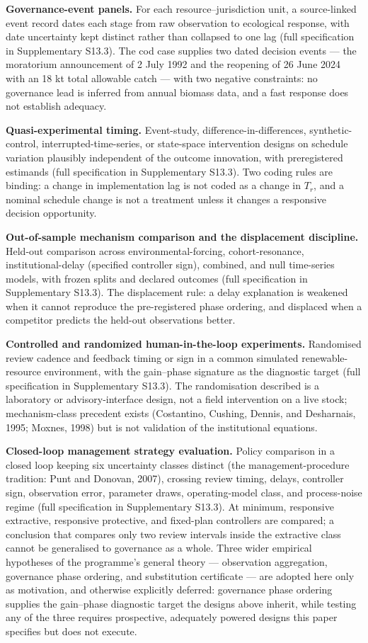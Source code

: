 \documentclass[11pt]{article}
\begin{document}
\textbf{Governance-event panels.} For each resource--jurisdiction unit, a source-linked event record dates each stage from raw observation to ecological response, with date uncertainty kept distinct rather than collapsed to one lag (full specification in Supplementary S13.3). The cod case supplies two dated decision events --- the moratorium announcement of 2 July 1992 and the reopening of 26 June 2024 with an 18 kt total allowable catch --- with two negative constraints: no governance lead is inferred from annual biomass data, and a fast response does not establish adequacy.

\textbf{Quasi-experimental timing.} Event-study, difference-in-differences, synthetic-control, interrupted-time-series, or state-space intervention designs on schedule variation plausibly independent of the outcome innovation, with preregistered estimands (full specification in Supplementary S13.3). Two coding rules are binding: a change in implementation lag is not coded as a change in \(T_r\), and a nominal schedule change is not a treatment unless it changes a responsive decision opportunity.

\textbf{Out-of-sample mechanism comparison and the displacement
discipline.} Held-out comparison across environmental-forcing, cohort-resonance, institutional-delay (specified controller sign), combined, and null time-series models, with frozen splits and declared outcomes (full specification in Supplementary S13.3). The displacement rule: a delay explanation is weakened when it cannot reproduce the pre-registered phase ordering, and displaced when a competitor predicts the held-out observations better.

\textbf{Controlled and randomized human-in-the-loop experiments.} Randomised review cadence and feedback timing or sign in a common simulated renewable-resource environment, with the gain--phase signature as the diagnostic target (full specification in Supplementary S13.3). The randomisation described is a laboratory or advisory-interface design, not a field intervention on a live stock; mechanism-class precedent exists (Costantino, Cushing, Dennis, and Desharnais, 1995; Moxnes, 1998) but is not validation of the institutional equations.

\textbf{Closed-loop management strategy evaluation.} Policy comparison in a closed loop keeping six uncertainty classes distinct (the management-procedure tradition: Punt and Donovan, 2007), crossing review timing, delays, controller sign, observation error, parameter draws, operating-model class, and process-noise regime (full specification in Supplementary S13.3). At minimum, responsive extractive, responsive protective, and fixed-plan controllers are compared; a conclusion that compares only two review intervals inside the extractive class cannot be generalised to governance as a whole. Three wider empirical hypotheses of the programme's general theory --- observation aggregation, governance phase ordering, and substitution certificate --- are adopted here only as motivation, and otherwise explicitly deferred: governance phase ordering supplies the gain--phase diagnostic target the designs above inherit, while testing any of the three requires prospective, adequately powered designs this paper specifies but does not execute.
\end{document}
